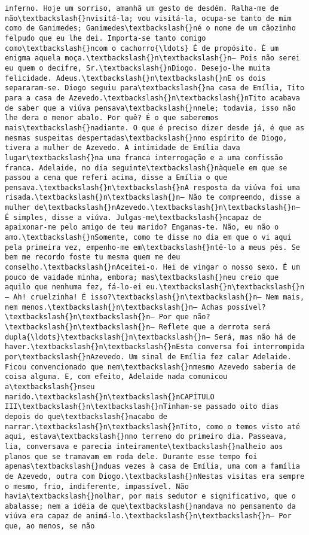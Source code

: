 \begin{Verbatim}[commandchars=\\\{\}]
inferno. Hoje um sorriso, amanhã um gesto de desdém. Ralha-me de não\textbackslash{}nvisitá-la; vou visitá-la, ocupa-se tanto de mim como de Ganimedes; Ganimedes\textbackslash{}né o nome de um cãozinho felpudo que eu lhe dei. Importa-se tanto comigo como\textbackslash{}ncom o cachorro{\ldots} É de propósito. É um enigma aquela moça.\textbackslash{}n\textbackslash{}n— Pois não serei eu quem o decifre, Sr.\textbackslash{}nDiogo. Desejo-lhe muita felicidade. Adeus.\textbackslash{}n\textbackslash{}nE os dois separaram-se. Diogo seguiu para\textbackslash{}na casa de Emília, Tito para a casa de Azevedo.\textbackslash{}n\textbackslash{}nTito acabava de saber que a viúva pensava\textbackslash{}nnele; todavia, isso não lhe dera o menor abalo. Por quê? É o que saberemos mais\textbackslash{}nadiante. O que é preciso dizer desde já, é que as mesmas suspeitas despertadas\textbackslash{}nno espírito de Diogo, tivera a mulher de Azevedo. A intimidade de Emília dava lugar\textbackslash{}na uma franca interrogação e a uma confissão franca. Adelaide, no dia seguinte\textbackslash{}nàquele em que se passou a cena que referi acima, disse a Emília o que pensava.\textbackslash{}n\textbackslash{}nA resposta da viúva foi uma risada.\textbackslash{}n\textbackslash{}n— Não te compreendo, disse a mulher de\textbackslash{}nAzevedo.\textbackslash{}n\textbackslash{}n— É simples, disse a viúva. Julgas-me\textbackslash{}ncapaz de apaixonar-me pelo amigo de teu marido? Enganas-te. Não, eu não o amo.\textbackslash{}nSomente, como te disse no dia em que o vi aqui pela primeira vez, empenho-me em\textbackslash{}ntê-lo a meus pés. Se bem me recordo foste tu mesma quem me deu conselho.\textbackslash{}nAceitei-o. Hei de vingar o nosso sexo. É um pouco de vaidade minha, embora; mas\textbackslash{}neu creio que aquilo que nenhuma fez, fá-lo-ei eu.\textbackslash{}n\textbackslash{}n— Ah! cruelzinha! É isso?\textbackslash{}n\textbackslash{}n— Nem mais, nem menos.\textbackslash{}n\textbackslash{}n— Achas possível?\textbackslash{}n\textbackslash{}n— Por que não?\textbackslash{}n\textbackslash{}n— Reflete que a derrota será dupla{\ldots}\textbackslash{}n\textbackslash{}n— Será, mas não há de haver.\textbackslash{}n\textbackslash{}nEsta conversa foi interrompida por\textbackslash{}nAzevedo. Um sinal de Emília fez calar Adelaide. Ficou convencionado que nem\textbackslash{}nmesmo Azevedo saberia de coisa alguma. E, com efeito, Adelaide nada comunicou a\textbackslash{}nseu marido.\textbackslash{}n\textbackslash{}nCAPÍTULO III\textbackslash{}n\textbackslash{}nTinham-se passado oito dias depois do que\textbackslash{}nacabo de narrar.\textbackslash{}n\textbackslash{}nTito, como o temos visto até aqui, estava\textbackslash{}nno terreno do primeiro dia. Passeava, lia, conversava e parecia inteiramente\textbackslash{}nalheio aos planos que se tramavam em roda dele. Durante esse tempo foi apenas\textbackslash{}nduas vezes à casa de Emília, uma com a família de Azevedo, outra com Diogo.\textbackslash{}nNestas visitas era sempre o mesmo, frio, indiferente, impassível. Não havia\textbackslash{}nolhar, por mais sedutor e significativo, que o abalasse; nem a idéia de que\textbackslash{}nandava no pensamento da viúva era capaz de animá-lo.\textbackslash{}n\textbackslash{}n— Por que, ao menos, se não 
\end{Verbatim}
